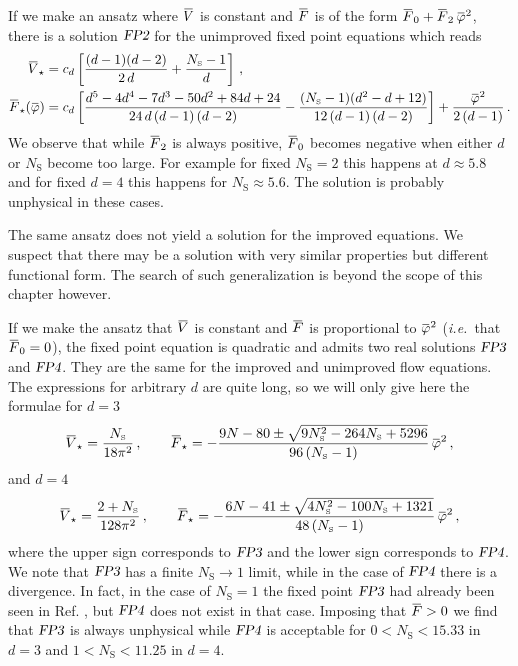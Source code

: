 \documentclass[11pt]{book} %
\newcommand{\overbar}[1]{\mkern 1.5mu\overline{\mkern-1.5mu#1\mkern-1.5mu}\mkern 1.5mu}
\newcommand\NS{ N_{\scriptscriptstyle{\mathrm{S}}} }
\newcommand{\FPtwo}  {\textsl{FP2}}
\newcommand{\FPthree}{\textsl{FP3}}
\newcommand{\FPfour} {\textsl{FP4}}
\newcommand{\bV}{\overbar V}
\newcommand{\bF}{\overbar F}
\newcommand{\bVstar}{\bV_\star}
\newcommand{\bFstar}{\bF_\star}
\newcommand{\bp}{\overbar \varphi}
\newcommand\ie{\textit{i.e.}\ }
\numberwithin{equation}{chapter}
\begin{document}
If we make an ansatz where $\bV$ is constant and $\bF$ is of the
form $\bF_0 + \bF_2 \, \bp^2$, there is a solution $\FPtwo$
for the unimproved fixed point equations which reads
\begin{align}
  \bVstar          &= c_d \left[\frac{(d-1) (d-2)}{2 \, d}+\frac{\NS-1}{d}\right] \,, \\
  \bFstar(\bp) &= c_d \left[ \frac{d^5-4 d^4-7 d^3-50 d^2+84 d+24}{24 \, d \, (d-1) \, (d-2)}
                  - \frac{(\NS-1)(d^2-d+12)}{12 \, (d-1) \, (d-2)}\right]
                  + \frac{\bp^2}{2 \, (d-1)}\,.
\end{align}
We observe that while $\bF_2$ is always positive,
$\bF_0$ becomes negative when either $d$ or $\NS$ become
too large. For example for fixed $\NS=2$ this happens at $d\approx 5.8$
and for fixed $d=4$ this happens for $\NS\approx 5.6$.
The solution is probably unphysical in these cases.

The same ansatz does not yield a solution for the improved equations.
We suspect that there may be a solution
with very similar properties but different functional form.
The search of such generalization is beyond the scope of this chapter however.

If we make the ansatz that $\bV$ is constant and $\bF$ is proportional
to $\bp^2$ (\ie that $\bF_0=0$), the fixed point equation is quadratic and admits two
real solutions $\FPthree$ and $\FPfour$.
They are the same for the improved and unimproved flow equations.
The expressions for arbitrary $d$ are quite long, so
we will only give here the formulae for $d=3$
\begin{align}
  \bVstar = \frac{\NS}{18\pi^2} \,, \qquad
  \bFstar = - \frac{ 9N - 80 \pm \sqrt{9\NS^2-264\NS+5296} }{ 96 \, (\NS-1) } \, \bp^2 \,,
\end{align}
and $d=4$
\begin{align}
  \bVstar = \frac{2+\NS}{128\pi^2} \,, \qquad
  \bFstar = - \frac{ 6N - 41 \pm \sqrt{4\NS^2-100\NS+1321} }{ 48 \, (\NS-1) } \, \bp^2 \,,
\end{align}
where the upper sign corresponds to $\FPthree$
and the lower sign corresponds to $\FPfour$.
We note that $\FPthree$ has a finite $\NS\to1$ limit,
while in the case of $\FPfour$ there is a divergence.
In fact, in the case of $\NS=1$ the fixed point $\FPthree$ had already been seen
in Ref. \cite{Percacci:2015wwa}, but $\FPfour$ does not exist in that case.
Imposing that $\bF>0$ we find that $\FPthree$ is always unphysical
while $\FPfour$ is acceptable for $0<\NS<15.33$ in $d=3$
and $1<\NS<11.25$ in $d=4$.
\end{document}
